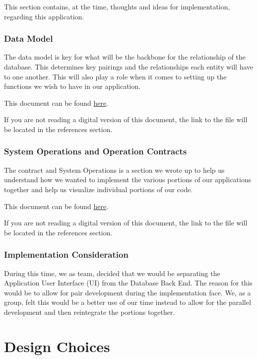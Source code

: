 \documentclass{article}
\begin{document}
	This section contains, at the time, thoughts and ideas for implementation, regarding this application. 
	
	\subsubsection{Data Model}
	
	The data model is key for what will be the backbone for the relationship of the database. This determines key pairings and the relationships each entity will have to one another. This will also play a role when it comes to setting up the functions we wish to have in our application.
	
	This document can be found \href{https://tinyurl.com/yckkpwyj}{here}.

		
	If you are not reading a digital version of this document, the link to the file will be located in the references section.
	
	\subsubsection{System Operations and Operation Contracts}
	
	The contract and System Operations is a section we wrote up to help us understand how we wanted to implement the various portions of our applications together and help us visualize individual portions of our code.
	
	This document can be found \href{https://tinyurl.com/yckkpwyj}{here}.
		
	If you are not reading a digital version of this document, the link to the file will be located in the references section.
	
	\subsubsection{Implementation Consideration}
	
	During this time, we as team, decided that we would be separating the Application User Interface (UI) from the Database Back End. The reason for this would be to allow for pair development during the implementation face. We, as a group, felt this would be a better use of our time instead to allow for the parallel development and then reintegrate the portions together.
	
	\section{Design Choices}
	
\end{document}
